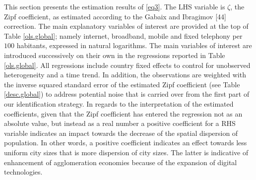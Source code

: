 \documentclass[10pt,letterpaper]{article}
\begin{document}
This section presents the estimation results of \ref{eq3}. The LHS
variable is \(\zeta\), the Zipf coefficient, as estimated according to
the Gabaix and Ibragimov {[}44{]} correction. The main explanatory
variables of interest are provided at the top of Table \ref{ols.global};
namely internet, broadband, mobile and fixed telephony per \(100\)
habitants, expressed in natural logarithms. The main variables of
interest are introduced successively on their own in the regressions
reported in Table \ref{ols.global}. All regressions include country
fixed effects to control for unobserved heterogeneity and a time trend.
In addition, the observations are weighted with the inverse squared
standard error of the estimated Zipf coefficient (see Table
\ref{desc.global}) to address potential noise that is carried over from
the first part of our identification strategy. In regards to the
interpretation of the estimated coefficients, given that the Zipf
coefficient has entered the regression not as an absolute value, but
instead as a real number a positive coefficient for a RHS variable
indicates an impact towards the decrease of the spatial dispersion of
population. In other words, a positive coefficient indicates an effect
towards less uniform city sizes that is more dispersion of city sizes.
The latter is indicative of enhancement of agglomeration economies
because of the expansion of digital technologies.
\end{document}
